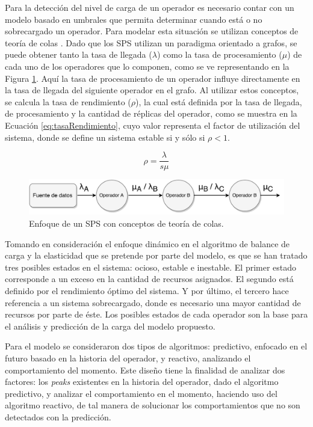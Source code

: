 Para la detección del nivel de carga de un operador es necesario contar con un modelo basado en umbrales que permita determinar cuando está o no sobrecargado un operador. Para modelar esta situación se utilizan conceptos de teoría de colas \citep{bose2013introduction}. Dado que los SPS utilizan un paradigma orientado a grafos, se puede obtener tanto la tasa de llegada ($\lambda$) como la tasa de procesamiento ($\mu$) de cada uno de los operadores que lo componen, como se ve representando en la Figura \ref{fig:analisisTeoriaColas}. Aquí la tasa de procesamiento de un operador influye directamente en la tasa de llegada del siguiente operador en el grafo. Al utilizar estos conceptos, se calcula la tasa de rendimiento ($\rho$), la cual está definida por la tasa de llegada, de procesamiento y la cantidad de réplicas del operador, como se muestra en la Ecuación \ref{eq:tasaRendimiento}, cuyo valor representa el factor de utilización del sistema, donde se define un sistema estable si y sólo si $\rho < 1$.

\begin{equation} \label{eq:tasaRendimiento}
	\rho = \frac{\lambda}{s \mu}
\end{equation}

\begin{figure}[!hb]
	\centering
		\includegraphics[scale=0.6]{images/AnalisisTeoriaColas.pdf}
	\caption{Enfoque de un SPS con conceptos de teoría de colas.}
	\label{fig:analisisTeoriaColas}
\end{figure}

Tomando en consideración el enfoque dinámico en el algoritmo de balance de carga y la elasticidad que se pretende por parte del modelo, es que se han tratado tres posibles estados en el sistema: ocioso, estable e inestable. El primer estado corresponde a un exceso en la cantidad de recursos asignados. El segundo está definido por el rendimiento óptimo del sistema. Y por último, el tercero hace referencia a un sistema sobrecargado, donde es necesario una mayor cantidad de recursos por parte de éste. Los posibles estados de cada operador son la base para el análisis y predicción de la carga del modelo propuesto.

Para el modelo se consideraron dos tipos de algoritmos: predictivo, enfocado en el futuro basado en la historia del operador, y reactivo, analizando el comportamiento del momento. Este diseño tiene la finalidad de analizar dos factores: los \textit{peaks} existentes en la historia del operador, dado el algoritmo predictivo, y analizar el comportamiento en el momento, haciendo uso del algoritmo reactivo, de tal manera de solucionar los comportamientos que no son detectados con la predicción.

